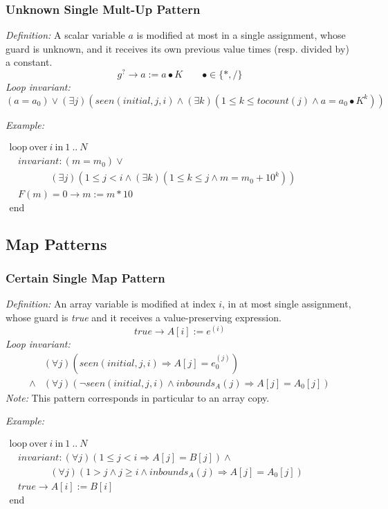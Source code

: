 \documentclass[a4paper,10pt]{article}
\newcommand{\idx}{\ensuremath{i}\xspace}
\newcommand{\idxinitial}{\ensuremath{\mathit{initial}}\xspace}
\newcommand{\at}[1]{{(#1)}}
\newcommand{\KWloop}{\ensuremath{\mathrm{loop}~}}
\newcommand{\KWend}{\ensuremath{\mathrm{end}~}}
\newcommand{\KWover}{\ensuremath{\mathrm{over}~}}
\newcommand{\KWin}{\ensuremath{~\mathrm{in}~}}
\newcommand{\impl}{\ensuremath{\Longrightarrow}}
\newcommand{\inbounds}[2]{\ensuremath{\mathit{inbounds}_{#1}(#2)}\xspace}
\newcommand{\seen}[3]{\ensuremath{\mathit{seen}{(#1,#2,#3)}}\xspace}
\newcommand{\tocount}[1]{\ensuremath{\mathit{tocount}(#1)}\xspace}
\newcommand{\loopinvariant}{\noindent\textit{Loop invariant:}\xspace}
\newcommand{\patterndef}{\noindent\textit{Definition:}\xspace}
\newcommand{\patternexample}{\noindent\textit{Example:}\xspace}
\newcommand{\patternnote}{\noindent\textit{Note:}\xspace}
\begin{document}
\subsubsection*{Unknown Single Mult-Up Pattern}

\patterndef A scalar variable $a$ is modified at most in a single assignment, whose
guard is unknown, and it receives its own previous value times
(resp. divided by) a constant.
%
$$g^? \rightarrow a := a \bullet K  \qquad \bullet \in \{*, / \}$$
%
\loopinvariant
%
$$(a = a_0) \lor (\exists j)(\seen{\idxinitial}{j}{\idx} \land (\exists k)(1 \leq k \leq \tocount{j} \land a = a_0 \bullet K^k))$$

\bigskip
\patternexample

\medskip
$\begin{array}{l}
  \KWloop \KWover i \KWin 1~..~N \\
  ~~~~ \textit{invariant}: (m = m_0) \lor \\
  ~~~~~~~~~~~~~~~~~~~ (\exists j)(1 \leq j < i \land (\exists k)(1 \leq k \leq j \land m = m_0+10^k))\\
  ~~~~ F(m)=0 \rightarrow m := m*10\\
  \KWend
\end{array}$

\subsection{Map Patterns}

\subsubsection*{Certain Single Map Pattern}

\patterndef An array variable is modified at index \idx, in at most single assignment, whose
guard is \textit{true} and it receives a value-preserving expression.
%
$$\mathit{true} \rightarrow A[\idx] := e^\at{\idx}$$
%
\loopinvariant
%
\begin{eqnarray*}
&(\forall j)(\seen{\idxinitial}{j}{\idx} \impl A[j] = e_0^\at{j}) \\
\land& (\forall j)(\neg \seen{\idxinitial}{j}{\idx} \land \inbounds{A}{j} \impl A[j] = A_0[j])
\end{eqnarray*}
%
\patternnote This pattern corresponds in particular to an array copy.

\bigskip
\patternexample

\medskip
$\begin{array}{l}
  \KWloop \KWover i \KWin 1~..~N \\
  ~~~~ \textit{invariant}: (\forall j)(1\leq j< i \impl A[j] = B[j]) \land\\
  ~~~~~~~~~~~~~~~~~~~ (\forall j)(1 > j \land j \geq i \land \inbounds{A}{j} \impl A[j] = A_0[j])\\
  ~~~~ true \rightarrow A[i] := B[i]\\
  \KWend
\end{array}$
\end{document}
